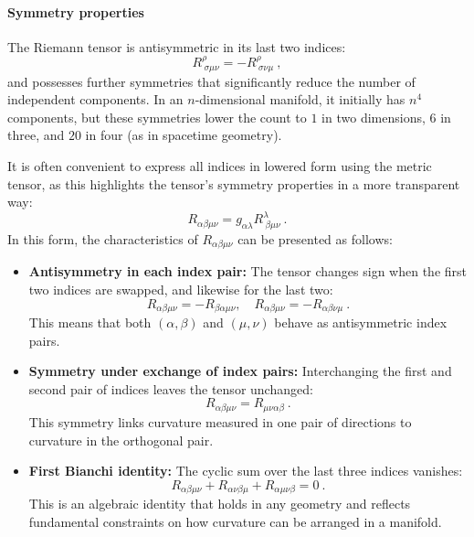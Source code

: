 \paragraph{Symmetry properties}

The Riemann tensor is antisymmetric in its last two indices:
\begin{equation}
R^\rho_{\ \sigma\mu\nu} = - R^\rho_{\ \sigma\nu\mu} \ ,
\end{equation}
and possesses further symmetries that significantly reduce the number of independent components. In an \(n\)-dimensional manifold, it initially has \(n^4\) components, but these symmetries lower the count to \(1\) in two dimensions, \(6\) in three, and \(20\) in four (as in spacetime geometry).

It is often convenient to express all indices in lowered form using the metric tensor, as this highlights the tensor's symmetry properties in a more transparent way:
\begin{equation}
R_{\alpha\beta\mu\nu} = g_{\alpha\lambda} R^{\lambda}_{\ \beta\mu\nu} \ .
\end{equation}
In this form, the characteristics of $R_{\alpha\beta\mu\nu}$ can be presented as follows:

\begin{itemize}
    \item \textbf{Antisymmetry in each index pair:} The tensor changes sign when the first two indices are swapped, and likewise for the last two:
    \begin{equation}
    R_{\alpha\beta\mu\nu} = - R_{\beta\alpha\mu\nu}, 
    \quad R_{\alpha\beta\mu\nu} = - R_{\alpha\beta\nu\mu} \ .
    \end{equation}
    This means that both $(\alpha,\beta)$ and $(\mu,\nu)$ behave as antisymmetric index pairs.


    \item \textbf{Symmetry under exchange of index pairs:} Interchanging the first and second pair of indices leaves the tensor unchanged:
    \begin{equation}
    R_{\alpha\beta\mu\nu} = R_{\mu\nu\alpha\beta} \ .
    \end{equation}
    This symmetry links curvature measured in one pair of directions to curvature in the orthogonal pair.

    \item \textbf{First Bianchi identity:} The cyclic sum over the last three indices vanishes:
    \begin{equation}
    R_{\alpha\beta\mu\nu} + R_{\alpha\nu\beta\mu} + R_{\alpha\mu\nu\beta} = 0 \ .
    \end{equation}
    This is an algebraic identity that holds in any geometry and reflects fundamental constraints on how curvature can be arranged in a manifold.

\end{itemize}

